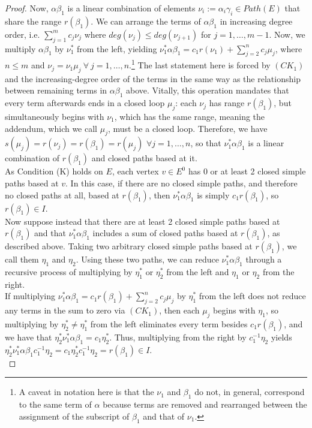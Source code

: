 \documentclass[12pt]{amsart}
\theoremstyle{plain} \numberwithin{equation}{section}
\theoremstyle{definition}
\newcommand{\frall}{\:\forall\:}
\theoremstyle{definition}
\begin{document}
\begin{proof}
Now, $\alpha\beta_1$ is a linear combination of elements $\nu_i := \alpha_i\gamma_i\in Path(E)$ that share the range $r(\beta_1)$. We can arrange the terms of $\alpha\beta_1$ in increasing degree order, i.e. $\sum_{j=1}^m c_j\nu_j$ where $deg(\nu_j)\leq deg(\nu_{j+1})$ for $j = 1,\dots ,m-1$. Now, we multiply $\alpha\beta_1$ by $\nu_1^*$ from the left, yielding $\nu_1^*\alpha\beta_1 = c_1r(\nu_1) + \sum_{j=2}^n c_j\mu_j$, where $n\leq m$ and $\nu_j = \nu_1 \mu_j \frall j = 1,\dots ,n$.\footnote{A caveat in notation here is that the $\nu_1$ and $\beta_1$ do not, in general, correspond to the same term of $\alpha$ because terms are removed and rearranged between the assignment of the subscript of $\beta_1$ and that of $\nu_1$.} The last statement here is forced by $(CK_1)$ and the increasing-degree order of the terms in the same way as the relationship between remaining terms in $\alpha\beta_1$ above. Vitally, this operation mandates that every term afterwards ends in a closed loop $\mu_j$: each $\nu_j$ has range $r(\beta_1)$, but simultaneously begins with $\nu_1$, which has the same range, meaning the addendum, which we call $\mu_j$, must be a closed loop. Therefore, we have $s(\mu_j) = r(\nu_j) = r(\beta_1) = r(\mu_j)$ $\forall j = 1,\ldots,n$, so that $\nu_1^*\alpha\beta_1$ is a linear combination of $r(\beta_1)$ and closed paths based at it. \\

As Condition (K) holds on $E$, each vertex $v\in E^0$ has 0 or at least 2 closed simple paths based at $v$. In this case, if there are no closed simple paths, and therefore no closed paths at all, based at $r(\beta_1)$, then $\nu_1^*\alpha\beta_1$ is simply $c_1r(\beta_1)$, so $ r(\beta_1)\in I$.
\\

Now suppose instead that there are at least 2 closed simple paths based at $r(\beta_1)$ and that $\nu_1^*\alpha\beta_1$ includes a sum of closed paths based at $r(\beta_1)$, as described above. Taking two arbitrary closed simple paths based at $r(\beta_1)$, we call them $\eta_1$ and $\eta_2$. Using these two paths, we can reduce $\nu_1^*\alpha\beta_1$ through a recursive process of multiplying by $\eta_1^*$ or $\eta_2^*$ from the left and $\eta_1$ or $\eta_2$ from the right. \\

If multiplying $\nu_1^*\alpha\beta_1 = c_1r(\beta_1) + \sum_{j=2}^n c_j\mu_j$ by $\eta_1^*$ from the left does not reduce any terms in the sum to zero via $(CK_1)$, then each $\mu_j$ begins with $\eta_1$, so multiplying by $\eta_2^* \neq \eta_1^*$ from the left eliminates every term besides $c_1r(\beta_1)$, and we have that $\eta_2^*\nu_1^*\alpha\beta_1 = c_1\eta_2^*$. Thus, multiplying from the right by $c_1^{-1}\eta_2$ yields $\eta_2^*\nu_1^*\alpha\beta_1c_1^{-1}\eta_2 = c_1\eta_2^*c_1^{-1}\eta_2 = r(\beta_1) \in I$.
\\


\end{proof}
\end{document}
